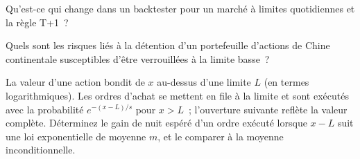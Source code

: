 \begin{interviewq}\label{iq:s1:asia-specific-equity-strategies:4}
Qu'est-ce qui change dans un backtester pour un marché à limites quotidiennes et la règle T+1~?
\end{interviewq}

\begin{interviewq}\label{iq:s1:asia-specific-equity-strategies:5}
Quels sont les risques liés à la détention d'un portefeuille d'actions de Chine continentale susceptibles d'être verrouillées à la limite basse~?
\end{interviewq}

\begin{interviewq}\label{iq:s1:asia-specific-equity-strategies:6}
La valeur d'une action bondit de $x$ au-dessus d'une limite $L$ (en termes logarithmiques). Les ordres d'achat se mettent en file à la limite et sont exécutés avec la probabilité $e^{-(x - L)/s}$ pour $x > L$~;
l'ouverture suivante reflète la valeur complète. Déterminez le gain de nuit espéré d'un ordre exécuté lorsque $x - L$ suit une loi exponentielle de moyenne $m$, et
le comparer à la moyenne inconditionnelle.
\end{interviewq}
